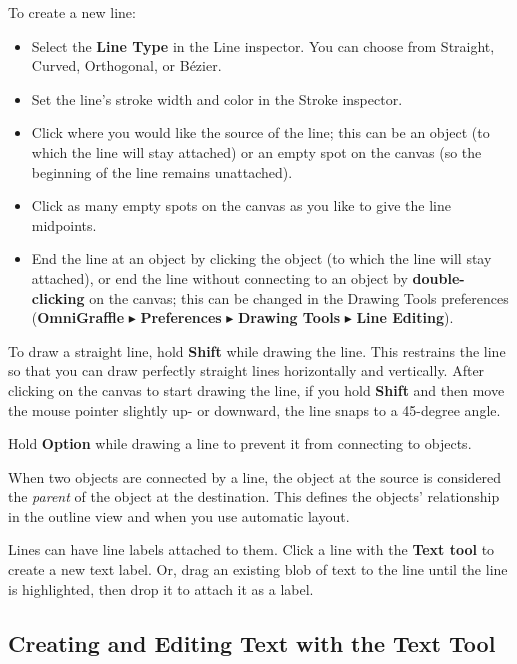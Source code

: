 \documentclass[../main.tex]{subfiles}
\begin{document}
To create a new line:

\begin{itemize}
  \item Select the \textbf{Line Type} in the Line inspector. You can choose from Straight,
    Curved, Orthogonal, or Bézier.
  \item Set the line's stroke width and color in the Stroke inspector.
  \item Click where you would like the source of the line; this can be an object (to which the
    line will stay attached) or an empty spot on the canvas (so the beginning of the line
    remains unattached).
  \item Click as many empty spots on the canvas as you like to give the line midpoints.
  \item End the line at an object by clicking the object (to which the line will stay attached),
    or end the line without connecting to an object by \textbf{double-clicking} on the canvas;
    this can be changed in the Drawing Tools preferences (\textbf{OmniGraffle}
      $\blacktriangleright$ \textbf{Preferences} $\blacktriangleright$ \textbf{Drawing Tools}
    $\blacktriangleright$ \textbf{Line Editing}).
\end{itemize}

To draw a straight line, hold \textbf{Shift} while drawing the line. This restrains the line so
that you can draw perfectly straight lines horizontally and vertically. After clicking on the
canvas to start drawing the line, if you hold \textbf{Shift} and then move the mouse pointer
slightly up- or downward, the line snaps to a 45-degree angle.

Hold \textbf{Option} while drawing a line to prevent it from connecting to objects.

When two objects are connected by a line, the object at the source is considered the
\textit{parent} of the object at the destination. This defines the objects' relationship in
the outline view and when you use automatic layout.

Lines can have line labels attached to them. Click a line with the \textbf{Text tool} to create
a new text label. Or, drag an existing blob of text to the line until the line is highlighted,
then drop it to attach it as a label.

\subsection{ Creating and Editing Text with the Text Tool}
\end{document}

